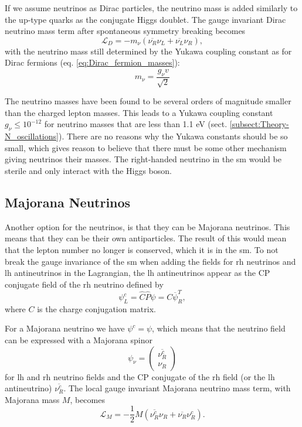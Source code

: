 \documentclass[a4paper, american, 12pt]{report}
\begin{document}
	If we assume neutrinos as Dirac particles, the neutrino mass is added similarly to the up-type quarks as the conjugate Higgs doublet. The gauge invariant Dirac neutrino mass term after spontaneous symmetry breaking becomes 
	\begin{equation}
	\label{eq:Dirac_neutrino}
		\mathcal{L}_D=-m_{\nu}(\overline{\nu_R}\nu_L + \overline{\nu_L}\nu_R),
	\end{equation}
	with the neutrino mass still determined by the Yukawa coupling constant as for Dirac fermions (eq. \ref{eq:Dirac_fermion_masses}):
	\begin{equation}
	\label{eq:Dirac_neutrino_mass}
		m_{\nu}=\frac{g_{\nu}v}{\sqrt{2}}
	\end{equation}
	
	The neutrino masses have been found to be several orders of magnitude smaller than the charged lepton masses. This leads to a Yukawa coupling constant $g_{\nu}\leq 10^{-12}$ for neutrino masses that are less than 1.1 eV (sect. \ref{subsect:Theory-N_oscillations}). There are no reasons why the Yukawa constants should be so small, which gives reason to believe that there must be some other mechanism giving neutrinos their masses. The right-handed neutrino in the \acrshort{sm} would be sterile and only interact with the Higgs boson.

		
	\subsection{Majorana Neutrinos}
	\label{subsect:Theory-Majorana_n}
	Another option for the neutrinos, is that they can be Majorana neutrinos. This means that they can be their own antiparticles. The result of this would mean that the lepton number no longer is conserved, which it is in the \acrshort{sm}. To not break the gauge invariance of the \acrshort{sm} when adding the fields for \acrshort{rh} neutrinos and \acrshort{lh} antineutrinos in the Lagrangian, the \acrshort{lh} antineutrinos appear as the CP conjugate field of the \acrshort{rh} neutrino\cite{thomson2013modern} defined by
	\begin{equation}
	\label{eq:LH_antin_CP}
		\psi^c_L = \hat{C}\hat{P}\psi= C\overline{\psi}_R^T,
	\end{equation}
	where $C$ is the charge conjugation matrix. 
	
	For a Majorana neutrino we have $\psi^c=\psi$, which means that the neutrino field can be expressed with a Majorana spinor
	\begin{equation}
	\label{eq:Majorana_spinors}
		\psi_{\nu}=
		\begin{pmatrix}
		\overline{\nu_R^c} \\ \nu_R 
		\end{pmatrix}
	\end{equation}
	for \acrshort{lh} and \acrshort{rh} neutrino fields and the CP conjugate of the \acrshort{rh} field (or the \acrshort{lh} antineutrino) $\overline{\nu_R^c}$. The local gauge invariant Majorana neutrino mass term, with Majorana mass $M$, becomes
	\begin{equation}
	\label{eq:Majorana_neutrino}
		\mathcal{L}_M=-\frac{1}{2}M(\overline{\nu^c_R}\nu_R + \overline{\nu_R}\nu_R^c). 
	\end{equation}
	
\end{document}
